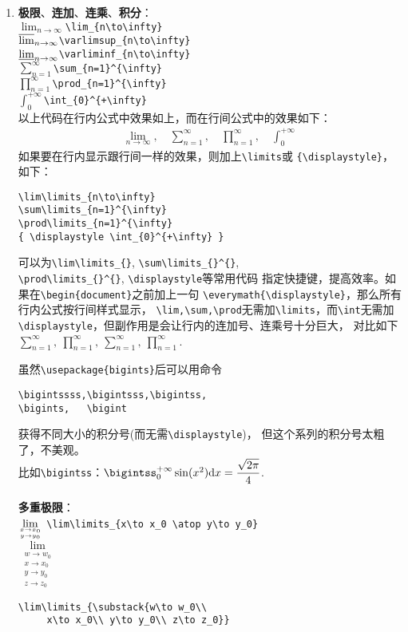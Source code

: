 \documentclass{article}
\newcommand{\q}{\quad}
\begin{document}
\begin{multicols}{2}
\begin{enumerate}
\item \textbf{极限}、\textbf{连加}、\textbf{连乘}、\textbf{积分}：\\
$ \lim_{n\to\infty} $\q \verb|\lim_{n\to\infty}| \\
$ \varlimsup_{n\to\infty} $\q \verb|\varlimsup_{n\to\infty}| \\
$ \varliminf_{n\to\infty} $\q \verb|\varliminf_{n\to\infty}| \\
$ \sum_{n=1}^{\infty} $\q\q \verb|\sum_{n=1}^{\infty}| \\
$ \prod_{n=1}^{\infty} $\q\q \verb|\prod_{n=1}^{\infty}| \\
$ \int_{0}^{+\infty} $\q\q\q \verb|\int_{0}^{+\infty}| \\
以上代码在行内公式中效果如上，而在行间公式中的效果如下：
\begin{gather*}
    \lim_{n\to\infty},\q \sum_{n=1}^{\infty},\q 
    \prod_{n=1}^{\infty},\q \int_{0}^{+\infty}
\end{gather*}
如果要在行内显示跟行间一样的效果，则加上\verb|\limits|或
\verb|{\displaystyle}|，如下：
\begin{lstlisting}
\lim\limits_{n\to\infty}
\sum\limits_{n=1}^{\infty}
\prod\limits_{n=1}^{\infty}
{ \displaystyle \int_{0}^{+\infty} }
\end{lstlisting} 
可以为\verb|\lim\limits_{}|, \verb|\sum\limits_{}^{}|,\\
\verb|\prod\limits_{}^{}|, \verb|\displaystyle|等常用代码
指定快捷键，提高效率。如果在\verb|\begin{document}|之前加上一句
\verb|\everymath{\displaystyle}|，那么所有行内公式按行间样式显示，
\verb|\lim,\sum,\prod|无需加\verb|\limits|，而\verb|\int|无需加
\verb|\displaystyle|，但副作用是会让行内的连加号、连乘号十分巨大，
对比如下$ \sum\limits_{n=1}^{\infty},\ 
\prod\limits_{n=1}^{\infty},\ { \displaystyle 
\sum_{n=1}^{\infty},\ \prod_{n=1}^{\infty} } $.

虽然\verb|\usepackage{bigints}|后可以用命令
\begin{lstlisting}
\bigintssss,\bigintsss,\bigintss,
\bigints,   \bigint    
\end{lstlisting} 
获得不同大小的积分号(而无需\verb|\displaystyle|)，
但这个系列的积分号太粗了，不美观。\\
比如\verb|\bigintss|：$ \bigintss_{0}^{+\infty} \sin(x^2)
\mathrm{d}x =\dfrac{\sqrt{2\pi}}{4} $.\\
\\
\textbf{多重极限}：\\
$ \lim\limits_{x\to x_0 \atop y\to y_0} $\q 
\verb|\lim\limits_{x\to x_0 \atop y\to y_0}| \\
$ \lim\limits_{\substack{w\to w_0\\ x\to x_0\\ y\to y_0\\ z\to z_0}} $  
\begin{lstlisting}
\lim\limits_{\substack{w\to w_0\\ 
     x\to x_0\\ y\to y_0\\ z\to z_0}}    
\end{lstlisting} 


\end{enumerate}
\end{multicols}
\end{document}
